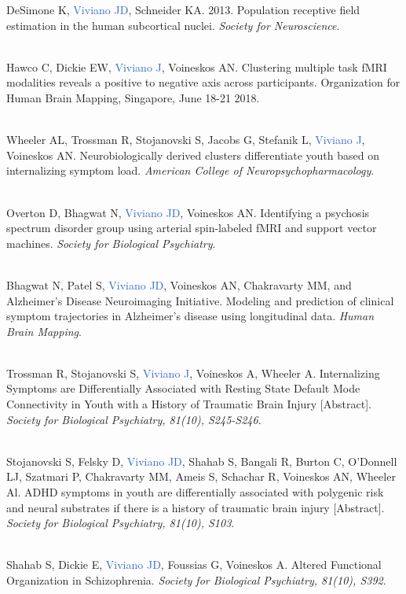 \documentclass[a4paper,11pt,oneside]{book}
\begin{document}
\begin{flushleft}
DeSimone K, \textcolor{highlight}{Viviano JD}, Schneider KA. 2013. Population receptive field estimation in the human subcortical nuclei. \textit{Society for Neuroscience}. \\\

Hawco C, Dickie EW, \textcolor{highlight}{Viviano J}, Voineskos AN. Clustering multiple task fMRI modalities reveals a positive to negative axis across participants. Organization for Human Brain Mapping, Singapore, June 18-21 2018. \\\

Wheeler AL, Trossman R, Stojanovski S, Jacobs G, Stefanik L, \textcolor{highlight}{Viviano J}, Voineskos AN. Neurobiologically derived clusters differentiate youth based on internalizing symptom load. \textit{American College of Neuropsychopharmacology}. \\\

Overton D, Bhagwat N, \textcolor{highlight}{Viviano JD}, Voineskos AN. Identifying a psychosis spectrum disorder group using arterial spin-labeled fMRI and support vector machines. \textit{Society for Biological Psychiatry}. \\\

Bhagwat N, Patel S, \textcolor{highlight}{Viviano JD}, Voineskos AN, Chakravarty MM, and Alzheimer's Disease Neuroimaging Initiative. Modeling and prediction of clinical symptom trajectories in Alzheimer's disease using longitudinal data. \textit{Human Brain Mapping}. \\\

Trossman R, Stojanovski S, \textcolor{highlight}{Viviano J}, Voineskos A, Wheeler A. Internalizing Symptoms are Differentially Associated with Resting State Default Mode Connectivity in Youth with a History of Traumatic Brain Injury [Abstract]. \textit{Society for Biological Psychiatry, 81(10), S245-S246}. \\\

Stojanovski S, Felsky D, \textcolor{highlight}{Viviano JD}, Shahab S, Bangali R, Burton C, O'Donnell LJ, Szatmari P, Chakravarty MM, Ameis S, Schachar R, Voineskos AN, Wheeler Al. ADHD symptoms in youth are differentially associated with polygenic risk and neural substrates if there is a history of traumatic brain injury [Abstract]. \textit{Society for Biological Psychiatry, 81(10), S103}. \\\

Shahab S, Dickie E, \textcolor{highlight}{Viviano JD}, Foussias G, Voineskos A. Altered Functional Organization in Schizophrenia. \textit{Society for Biological Psychiatry, 81(10), S392}. \\\


\end{flushleft}
\end{document}
